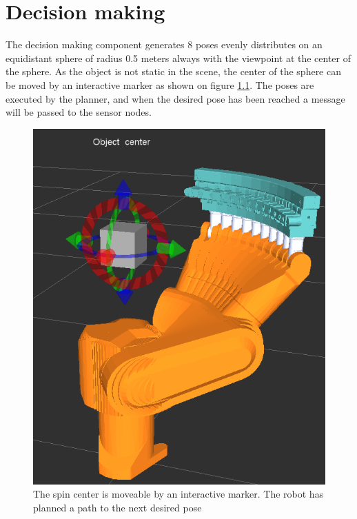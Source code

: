 \chapter{Decision making}
The decision making component generates 8 poses evenly distributes on an equidistant sphere of radius 0.5 meters always with the viewpoint at the center of the sphere. As the object is not static in the scene, the center of the sphere can be moved by an interactive marker as shown on figure \ref{fig:robot_moving_around_object}. The poses are executed by the planner, and when the desired pose has been reached a message will be passed to the sensor nodes.


\begin{figure}[htb]
	\begin{center}
		\includegraphics[scale=0.5,trim=0 0 0 0]{graphics/04_decisionmaking/robot_moving_around_object.png}%
		\caption{The spin center is moveable by an interactive marker. The robot has planned a path to the next desired pose}
		\label{fig:robot_moving_around_object}
	\end{center}
\end{figure}

